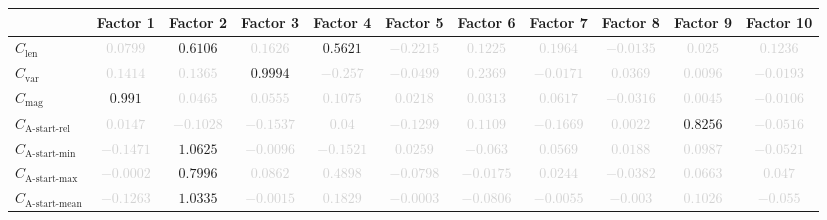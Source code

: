 \documentclass{standalone}
\newcommand{\magnitudename}{\text{mag}}
\newcommand{\magnitude}{C_{\magnitudename}}
\newcommand{\varietyname}{\text{var}}
\newcommand{\variety}{C_{\varietyname}}
\newcommand{\lengthname}{\text{len}}
\newcommand{\length}{C_{\lengthname}}
\newcommand{\startactivitiesrelname}{\text{A-start-rel}}
\newcommand{\startactivitiesrel}{C_{\startactivitiesrelname}}
\newcommand{\startminname}{\text{A-start-min}}
\newcommand{\startmin}{C_{\startminname}}
\newcommand{\startmaxname}{\text{A-start-max}}
\newcommand{\startmax}{C_{\startmaxname}}
\newcommand{\startmeanname}{\text{A-start-mean}}
\newcommand{\startmean}{C_{\startmeanname}}
\begin{document}
\begin{tabular}{lcccccccccc} \toprule 
 & \textbf{Factor 1} & \textbf{Factor 2} & \textbf{Factor 3} & \textbf{Factor 4} & \textbf{Factor 5} & \textbf{Factor 6} & \textbf{Factor 7} & \textbf{Factor 8} & \textbf{Factor 9} & \textbf{Factor 10} \\ \midrule 
$\length$ & \textcolor{lightgray}{$0.0799$} & $0.6106$ & \textcolor{lightgray}{$0.1626$} & $0.5621$ & \textcolor{lightgray}{$-0.2215$} & \textcolor{lightgray}{$0.1225$} & \textcolor{lightgray}{$0.1964$} & \textcolor{lightgray}{$-0.0135$} & \textcolor{lightgray}{$0.025$} & \textcolor{lightgray}{$0.1236$} \\ 
$\variety$ & \textcolor{lightgray}{$0.1414$} & \textcolor{lightgray}{$0.1365$} & $0.9994$ & \textcolor{lightgray}{$-0.257$} & \textcolor{lightgray}{$-0.0499$} & \textcolor{lightgray}{$0.2369$} & \textcolor{lightgray}{$-0.0171$} & \textcolor{lightgray}{$0.0369$} & \textcolor{lightgray}{$0.0096$} & \textcolor{lightgray}{$-0.0193$} \\ 
$\magnitude$ & $0.991$ & \textcolor{lightgray}{$0.0465$} & \textcolor{lightgray}{$0.0555$} & \textcolor{lightgray}{$0.1075$} & \textcolor{lightgray}{$0.0218$} & \textcolor{lightgray}{$0.0313$} & \textcolor{lightgray}{$0.0617$} & \textcolor{lightgray}{$-0.0316$} & \textcolor{lightgray}{$0.0045$} & \textcolor{lightgray}{$-0.0106$} \\ 
$\startactivitiesrel$ & \textcolor{lightgray}{$0.0147$} & \textcolor{lightgray}{$-0.1028$} & \textcolor{lightgray}{$-0.1537$} & \textcolor{lightgray}{$0.04$} & \textcolor{lightgray}{$-0.1299$} & \textcolor{lightgray}{$0.1109$} & \textcolor{lightgray}{$-0.1669$} & \textcolor{lightgray}{$0.0022$} & $0.8256$ & \textcolor{lightgray}{$-0.0516$} \\ 
$\startmin$ & \textcolor{lightgray}{$-0.1471$} & $1.0625$ & \textcolor{lightgray}{$-0.0096$} & \textcolor{lightgray}{$-0.1521$} & \textcolor{lightgray}{$0.0259$} & \textcolor{lightgray}{$-0.063$} & \textcolor{lightgray}{$0.0569$} & \textcolor{lightgray}{$0.0188$} & \textcolor{lightgray}{$0.0987$} & \textcolor{lightgray}{$-0.0521$} \\ 
$\startmax$ & \textcolor{lightgray}{$-0.0002$} & $0.7996$ & \textcolor{lightgray}{$0.0862$} & \textcolor{lightgray}{$0.4898$} & \textcolor{lightgray}{$-0.0798$} & \textcolor{lightgray}{$-0.0175$} & \textcolor{lightgray}{$0.0244$} & \textcolor{lightgray}{$-0.0382$} & \textcolor{lightgray}{$0.0663$} & \textcolor{lightgray}{$0.047$} \\ 
$\startmean$ & \textcolor{lightgray}{$-0.1263$} & $1.0335$ & \textcolor{lightgray}{$-0.0015$} & \textcolor{lightgray}{$0.1829$} & \textcolor{lightgray}{$-0.0003$} & \textcolor{lightgray}{$-0.0806$} & \textcolor{lightgray}{$-0.0055$} & \textcolor{lightgray}{$-0.003$} & \textcolor{lightgray}{$0.1026$} & \textcolor{lightgray}{$-0.055$} \\ 

\end{tabular}
\end{document}
